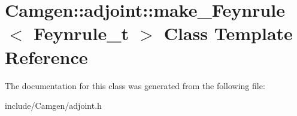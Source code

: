 \hypertarget{a00340}{\section{Camgen\-:\-:adjoint\-:\-:make\-\_\-\-Feynrule$<$ Feynrule\-\_\-t $>$ Class Template Reference}
\label{a00340}
}


The documentation for this class was generated from the following file\-:\begin{DoxyCompactItemize}
\item 
include/\-Camgen/adjoint.\-h\end{DoxyCompactItemize}
